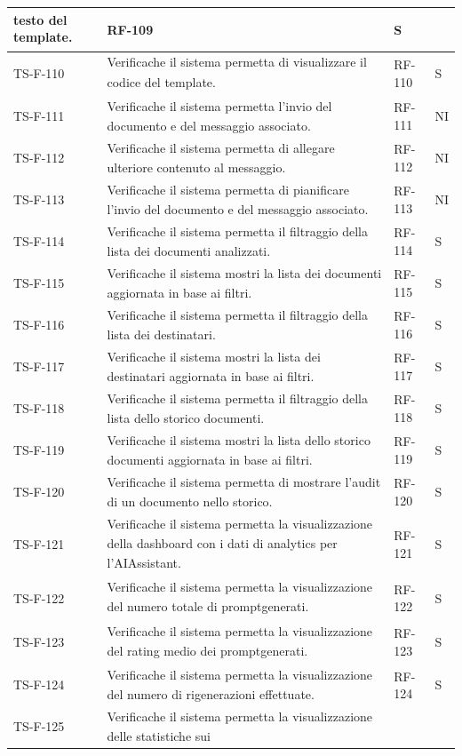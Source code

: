 \documentclass[a4paper,11pt]{article}
\renewcommand{\G}{\texorpdfstring{\textsubscript{\scalebox{0.6}{\textbf{G}}}\xspace}{ G}}
\begin{document}
\begin{longtable}{|p{2.2cm}|p{8.3cm}|p{2cm}|p{1.5cm}|}
testo del template\G. & RF-109 & S \\ \hline
TS-F-110 & Verifica\G che il sistema permetta di visualizzare il
codice del template\G. & RF-110 & S \\ \hline
TS-F-111 & Verifica\G che il sistema permetta l’invio del
documento e del messaggio associato. & RF-111 & NI \\ \hline
TS-F-112 & Verifica\G che il sistema permetta di allegare
ulteriore contenuto al messaggio. & RF-112 & NI \\ \hline
TS-F-113 & Verifica\G che il sistema permetta di pianificare l’invio del documento e del messaggio
associato. & RF-113 & NI \\ \hline
TS-F-114 & Verifica\G che il sistema permetta il filtraggio della
lista dei documenti analizzati. & RF-114 & S \\ \hline
TS-F-115 & Verifica\G che il sistema mostri la lista dei
documenti aggiornata in base ai filtri. & RF-115 & S \\ \hline
TS-F-116 & Verifica\G che il sistema permetta il filtraggio della
lista dei destinatari. & RF-116 & S \\ \hline
TS-F-117 & Verifica\G che il sistema mostri la lista dei
destinatari aggiornata in base ai filtri. & RF-117 & S \\ \hline
TS-F-118 & Verifica\G che il sistema permetta il filtraggio della
lista dello storico documenti. & RF-118 & S \\ \hline
TS-F-119 & Verifica\G che il sistema mostri la lista dello storico
documenti aggiornata in base ai filtri. & RF-119 & S \\ \hline
TS-F-120 & Verifica\G che il sistema permetta di mostrare
l’audit di un documento nello storico. & RF-120 & S \\ \hline
TS-F-121 & Verifica\G che il sistema permetta la visualizzazione della dashboard\G
con i dati di analytics per l’AI\G Assistant. & RF-121 & S \\ \hline
TS-F-122 & Verifica\G che il sistema permetta la visualizzazione del numero totale
di prompt\G generati. & RF-122 & S \\ \hline
TS-F-123 & Verifica\G che il sistema permetta la visualizzazione del rating medio
dei prompt\G generati. & RF-123 & S \\ \hline
TS-F-124 & Verifica\G che il sistema permetta la visualizzazione del numero di
rigenerazioni effettuate. & RF-124 & S \\ \hline
TS-F-125 & Verifica\G che il sistema permetta la visualizzazione delle statistiche sui

\end{longtable}
\end{document}
